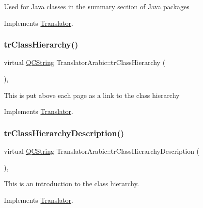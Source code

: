 Used for Java classes in the summary section of Java packages 

Implements \mbox{\hyperlink{class_translator}{Translator}}.

\mbox{\label{class_translator_arabic_ab0007c6202f51fdafa65ef7a92852660}} 
\subsubsection{\texorpdfstring{trClassHierarchy()}{trClassHierarchy()}}
{\footnotesize\ttfamily virtual \mbox{\hyperlink{class_q_c_string}{Q\+C\+String}} Translator\+Arabic\+::tr\+Class\+Hierarchy (\begin{DoxyParamCaption}{ }\end{DoxyParamCaption})\hspace{0.3cm}{\ttfamily [inline]}, {\ttfamily [virtual]}}

This is put above each page as a link to the class hierarchy 

Implements \mbox{\hyperlink{class_translator}{Translator}}.

\mbox{\label{class_translator_arabic_a173d4670408b8048ce49941841f87bc7}} 
\subsubsection{\texorpdfstring{trClassHierarchyDescription()}{trClassHierarchyDescription()}}
{\footnotesize\ttfamily virtual \mbox{\hyperlink{class_q_c_string}{Q\+C\+String}} Translator\+Arabic\+::tr\+Class\+Hierarchy\+Description (\begin{DoxyParamCaption}{ }\end{DoxyParamCaption})\hspace{0.3cm}{\ttfamily [inline]}, {\ttfamily [virtual]}}

This is an introduction to the class hierarchy. 

Implements \mbox{\hyperlink{class_translator}{Translator}}.

\mbox{\label{class_translator_arabic_a87c4d89643371e232eda030de5b28471}} 
